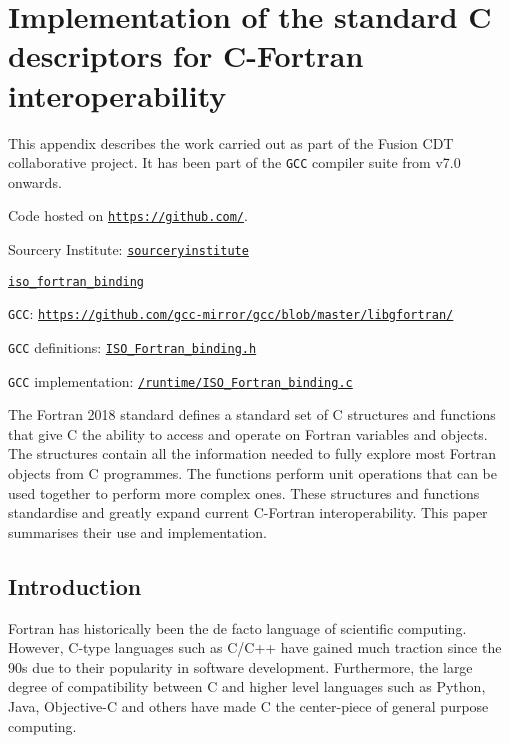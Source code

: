 \chapter{Implementation of the standard C descriptors for C-Fortran interoperability}\label{c:isocbinding}

This appendix describes the work carried out as part of the Fusion CDT collaborative project. It has been part of the \texttt{GCC} compiler suite from v7.0 onwards.

Code hosted on \href{https://github.comhttps://github.com/}{\texttt{https://github.com/}}.

\noindent Sourcery Institute: \href{https://github.com/sourceryinstitute/}{\texttt{sourceryinstitute}}

\noindent\href{https://github.com/sourceryinstitute/iso_Fortran_binding/}{\texttt{iso\_fortran\_binding}}

\noindent\texttt{GCC}: \href{https://github.com/gcc-mirror/gcc/blob/master/libgfortran/}{\texttt{https://github.com/gcc-mirror/gcc/blob/master/libgfortran/}}

\noindent \texttt{GCC} definitions: \href{https://github.com/gcc-mirror/gcc/blob/master/libgfortran/ISO_Fortran_binding.h}{\texttt{ISO\_Fortran\_binding.h}}

\noindent\texttt{GCC} implementation: \href{https://github.com/gcc-mirror/gcc/blob/master/libgfortran/runtime/ISO_Fortran_binding.c}{\texttt{/runtime/ISO\_Fortran\_binding.c}}

The Fortran 2018 standard \cite{fortran} defines a standard set of C structures and functions that give C the ability to access and operate on Fortran variables and objects. The structures contain all the information needed to fully explore most Fortran objects from C programmes. The functions perform unit operations that can be used together to perform more complex ones. These structures and functions standardise and greatly expand current C-Fortran interoperability. This paper summarises their use and implementation.

\section{Introduction}

Fortran has historically been the de facto language of scientific computing. However, C-type languages such as C/C++ have gained much traction since the 90s due to their popularity in software development. Furthermore, the large degree of compatibility between C and higher level languages such as Python, Java, Objective-C and others have made C the center-piece of general purpose computing.

